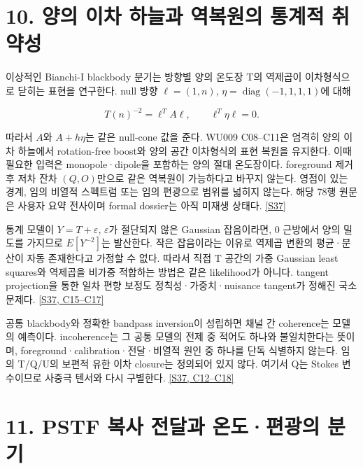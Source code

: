 \documentclass[11pt,a4paper]{article}
\begin{document}
\hypertarget{s10}{}

\section*{10. 양의 이차 하늘과 역복원의 통계적 취약성}


이상적인 Bianchi-I blackbody 분기는 방향별 양의 온도장 T의 역제곱이 이차형식으로 닫히는 표현을 연구한다. null 방향 \(\ell=(1,n)\), \(\eta=\operatorname{diag}(-1,1,1,1)\)에 대해


\[
T(n)^{-2}=\ell^TA\ell,\qquad \ell^T\eta\ell=0.
\]

따라서 \(A\)와 \(A+h\eta\)는 같은 null-cone 값을 준다. WU009 C08–C11은 엄격히 양의 이차 하늘에서 rotation-free boost와 양의 공간 이차형식의 표현 복원을 유지한다. 이때 필요한 입력은 monopole·dipole을 포함하는 양의 절대 온도장이다. foreground 제거 후 저차 잔차 \((Q,O)\)만으로 같은 역복원이 가능하다고 바꾸지 않는다. 영점이 있는 경계, 임의 비열적 스펙트럼 또는 임의 편광으로 범위를 넓히지 않는다. 해당 78행 원문은 사용자 요약 전사이며 formal dossier는 아직 미재생 상태다. \hyperlink{src:S37}{[S37]}


통계 모델이 \(Y=T+\varepsilon\), \(\varepsilon\)가 절단되지 않은 Gaussian 잡음이라면, 0 근방에서 양의 밀도를 가지므로 \(E[Y^{-2}]\)는 발산한다. 작은 잡음이라는 이유로 역제곱 변환의 평균·분산이 자동 존재한다고 가정할 수 없다. 따라서 직접 T 공간의 가중 Gaussian least squares와 역제곱을 비가중 적합하는 방법은 같은 likelihood가 아니다. tangent projection을 통한 일차 편향 보정도 정칙성·가중치·nuisance tangent가 정해진 국소 문제다. \hyperlink{src:S37}{[S37, C15–C17]}


공통 blackbody와 정확한 bandpass inversion이 성립하면 채널 간 coherence는 모델의 예측이다. incoherence는 그 공통 모델의 전제 중 적어도 하나와 불일치한다는 뜻이며, foreground·calibration·전달·비열적 원인 중 하나를 단독 식별하지 않는다. 임의 T/Q/U의 보편적 유한 이차 closure는 정의되어 있지 않다. 여기서 Q는 Stokes 변수이므로 사중극 텐서와 다시 구별한다. \hyperlink{src:S37}{[S37, C12–C18]}


\hypertarget{s11}{}

\section*{11. PSTF 복사 전달과 온도·편광의 분기}

\end{document}
